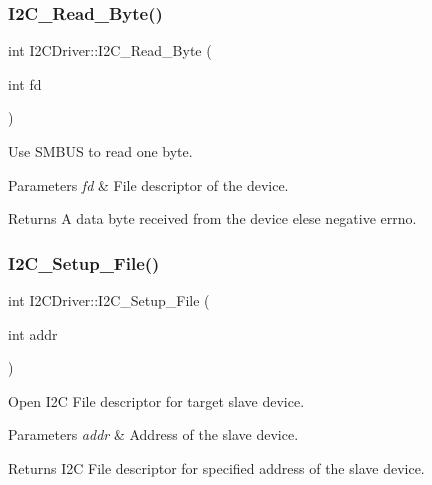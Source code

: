 \subsubsection{\texorpdfstring{I2\+C\+\_\+\+Read\+\_\+\+Byte()}{I2C\_Read\_Byte()}}
{\footnotesize\ttfamily int I2\+C\+Driver\+::\+I2\+C\+\_\+\+Read\+\_\+\+Byte (\begin{DoxyParamCaption}\item[{int}]{fd }\end{DoxyParamCaption})}

Use S\+M\+B\+US to read one byte.


\begin{DoxyParams}{Parameters}
{\em fd} & File descriptor of the device.\\
\hline
\end{DoxyParams}
\begin{DoxyReturn}{Returns}
A data byte received from the device elese negative errno. 
\end{DoxyReturn}
\mbox{\label{classI2CDriver_ae25c889f0a2540eee34d53e0228fe914}} 
\subsubsection{\texorpdfstring{I2\+C\+\_\+\+Setup\+\_\+\+File()}{I2C\_Setup\_File()}}
{\footnotesize\ttfamily int I2\+C\+Driver\+::\+I2\+C\+\_\+\+Setup\+\_\+\+File (\begin{DoxyParamCaption}\item[{int}]{addr }\end{DoxyParamCaption})}

Open I2C File descriptor for target slave device.


\begin{DoxyParams}{Parameters}
{\em addr} & Address of the slave device.\\
\hline
\end{DoxyParams}
\begin{DoxyReturn}{Returns}
I2C File descriptor for specified address of the slave device. 
\end{DoxyReturn}
\mbox{\label{classI2CDriver_a445d2ef0ba5f742fb8264c202dae4a8d}} 
